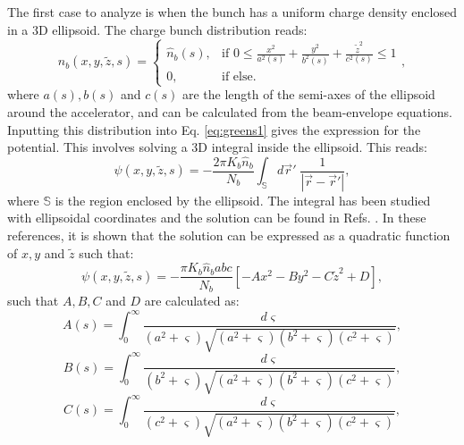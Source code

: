 The first case to analyze is when the bunch has a uniform charge density enclosed in a 3D ellipsoid. The charge bunch distribution reads:
\begin{equation}
    \label{eq:dist}
    n_b(x,y,\tilde{z},s) = \left\{
        \begin{array}{cc} 
            \hat{n}_b(s), & \text{if  } 0 \leq \frac{x^2}{a^2(s)} + \frac{y^2}{b^2(s)} + \frac{\tilde{z}^2}{c^2(s)} \leq 1\\
            0, & \text{if else.}
        \end{array} 
    \right.,
\end{equation}
where $a(s),b(s)$ and $c(s)$ are the length of the semi-axes of the ellipsoid around the accelerator, and can be calculated from the beam-envelope equations. Inputting this distribution into Eq. \ref{eq:greens1} gives the expression for the potential. This involves solving a 3D integral inside the ellipsoid. This reads:
\begin{equation}
    \label{eq:potential1}
    \psi(x,y,\tilde{z},s)=-\frac{2 \pi K_b \hat{n}_b}{N_b} \int_{\mathbb{S}} d\vec{r}' \; \frac{1}{\left| \vec{r}-\vec{r}' \right|},
\end{equation} 
where $\mathbb{S}$ is the region enclosed by the ellipsoid. The integral has been studied with ellipsoidal coordinates and the solution can be found in Refs. \cite{Kellog_1967, witchcraft}. In these references, it is shown that the solution can be expressed as a quadratic function of $x,y$ and $\tilde{z}$ such that:
\begin{equation}
    \label{eq:potential2}
    \psi(x,y,\tilde{z},s)=-\frac{\pi K_b \hat{n}_b a b c }{N_b} \left[ -A x^2 -B y^2 - C \tilde{z}^2 +D \right],
\end{equation}
such that $A,B,C$ and $D$ are calculated as:
\begin{equation}
    \label{eq:A}
    A(s)=\int_0^{\infty}{\frac{d \varsigma }{\left( a^2+ \varsigma \right) \sqrt{\left( a^2+ \varsigma \right) \left( b^2+ \varsigma \right) \left( c^2+ \varsigma \right)}}},
\end{equation}
\begin{equation}
    \label{eq:B}
    B(s)=\int_0^{\infty}{\frac{d \varsigma }{\left( b^2+ \varsigma \right) \sqrt{\left( a^2+ \varsigma \right)\left( b^2+ \varsigma \right)\left( c^2+ \varsigma \right)}}},
\end{equation}
\begin{equation}
    \label{eq:C}
    C(s)=\int_0^{\infty}{\frac{d \varsigma }{\left( c^2+ \varsigma \right) \sqrt{\left( a^2+ \varsigma \right) \left( b^2+ \varsigma \right) \left( c^2+ \varsigma \right)}}},
\end{equation}
